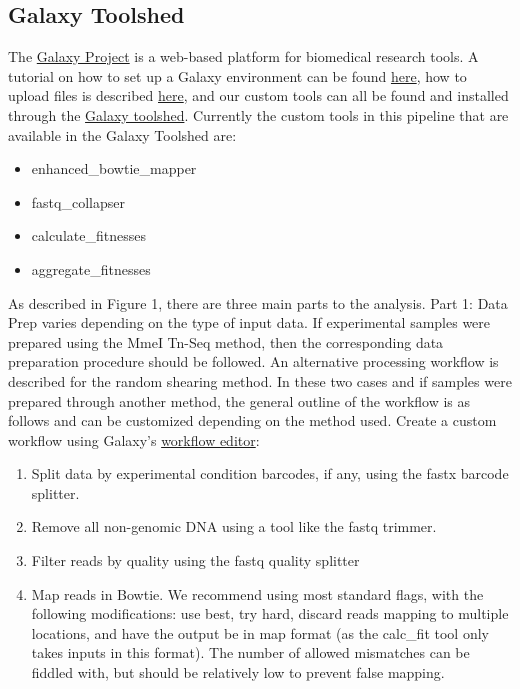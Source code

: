 \documentclass[11pt,]{article}
\providecommand{\tightlist}{%
  \setlength{\itemsep}{0pt}\setlength{\parskip}{0pt}}
\begin{document}
\subsection{Galaxy Toolshed}\label{galaxy-toolshed}

The \href{https://galaxyproject.org/}{Galaxy Project} is a web-based
platform for biomedical research tools. A tutorial on how to set up a
Galaxy environment can be found
\href{https://wiki.galaxyproject.org/Admin/GetGalaxy}{here}, how to
upload files is described
\href{https://wiki.galaxyproject.org/Admin/DataLibraries/UploadingLibraryFiles}{here},
and our custom tools can all be found and installed through the
\href{https://wiki.galaxyproject.org/Admin/Tools/AddToolFromToolShedTutorial}{Galaxy
toolshed}. Currently the custom tools in this pipeline that are
available in the Galaxy Toolshed are:

\begin{itemize}
\tightlist
\item
  enhanced\_bowtie\_mapper
\item
  fastq\_collapser
\item
  calculate\_fitnesses
\item
  aggregate\_fitnesses
\end{itemize}

As described in Figure 1, there are three main parts to the analysis.
Part 1: Data Prep varies depending on the type of input data. If
experimental samples were prepared using the MmeI Tn-Seq method, then
the corresponding data preparation procedure should be followed. An
alternative processing workflow is described for the random shearing
method. In these two cases and if samples were prepared through another
method, the general outline of the workflow is as follows and can be
customized depending on the method used. Create a custom workflow using
Galaxy's
\href{https://wiki.galaxyproject.org/Learn/AdvancedWorkflow}{workflow
editor}:

\begin{enumerate}
\def\labelenumi{\arabic{enumi}.}
\tightlist
\item
  Split data by experimental condition barcodes, if any, using the fastx
  barcode splitter.
\item
  Remove all non-genomic DNA using a tool like the fastq trimmer.
\item
  Filter reads by quality using the fastq quality splitter
\item
  Map reads in Bowtie. We recommend using most standard flags, with the
  following modifications: use best, try hard, discard reads mapping to
  multiple locations, and have the output be in map format (as the
  calc\_fit tool only takes inputs in this format). The number of
  allowed mismatches can be fiddled with, but should be relatively low
  to prevent false mapping.
\end{enumerate}
\end{document}
